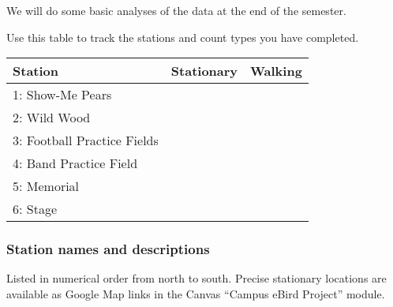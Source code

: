 \documentclass[12pt]{article}
\begin{document}
We will do some basic analyses of the data at the end of the semester.

Use this table to track the stations and count types you have completed.

\begin{tabular}{lcc}

\toprule

Station & Stationary & Walking \tabularnewline

\midrule

1: Show-Me Pears & & \tabularnewline

\midrule

2: Wild Wood & & \tabularnewline

\midrule

3: Football Practice Fields & & \tabularnewline

\midrule

4: Band Practice Field & & \tabularnewline

\midrule

5: Memorial  & & \tabularnewline

\midrule

6: Stage & & \tabularnewline

\bottomrule

\end{tabular}

\newpage

\subsubsection*{Station names and descriptions}

Listed in numerical order from north to south. Precise stationary locations are available as Google Map links in the Canvas “Campus eBird Project” module.
\end{document}
